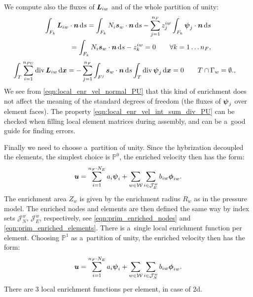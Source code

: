 We compute also the fluxes of $\mathbf{\boldsymbol{L}}_{iw}$ and of the whole partition of unity:
\begin{align}
    \int_{F_k} \mathbf{\boldsymbol{L}}_{iw}\cdot\mathbf{\boldsymbol{n}} \,{\rm d} s = \int_{F_k} N_i \mathbf{\boldsymbol{s}}_w\cdot\mathbf{\boldsymbol{n}} \,{\rm d} s
        - \sum \limits_{j=1}^{n_F} z^{iw}_j \int_{F_k} \mathbf{\boldsymbol{\psi}}_j \cdot \mathbf{\boldsymbol{n}} \,{\rm d} s \nonumber\\
    = \int_{F_k} N_i \mathbf{\boldsymbol{s}}_w\cdot\mathbf{\boldsymbol{n}} \,{\rm d} s - z^{iw}_k = 0 \qquad \forall k=1\ldots n_F
    \label{eqn:local_enr_vel_normal_PU},
\end{align}
\begin{align}
    \int_{T} \sum \limits_{i=1}^{n_{PU}} \div\,\vc L_{iw}\dd\bx =
        - \sum \limits_{j=1}^{n_F} \int_{F^j} \vc s_w\cdot\vc n \dd s
        \int_T \div\,\vc\psi_j \dd \bx %
        = 0 & \qquad T \cap \Gamma_w=\emptyset.
    \label{eqn:local_enr_vel_int_sum_div_PU},
\end{align}
We see from \eqref{eqn:local_enr_vel_normal_PU} that this kind of enrichment does not affect the meaning of the standard
degrees of freedom (the fluxes of $\mathbf{\boldsymbol{\psi}}_j$ over element faces).
The property \eqref{eqn:local_enr_vel_int_sum_div_PU} can be checked when filling local element matrices during assembly,
and can be a~good guide for finding errors.

Finally we need to choose a~partition of unity. Since the hybrization decoupled the elements,
the simplest choice is $\mathbb P^0$, 
the enriched velocity then has the form:
\begin{equation}
    \mathbf{\boldsymbol{u}} = 
    \sum \limits_{i=1}^{n_F\cdot N_E} a_i \mathbf{\boldsymbol{\psi}}_i + 
    \sum \limits_{w\in\mathcal{W}} \sum \limits_{i\in\mathcal{J}^w_E} b_{iw} \mathbf{\boldsymbol{\phi}}_{iw}.
\end{equation}
The enrichment area $Z_w$ is given by the enrichment radius $R_w$ as in the pressure model.
The enriched nodes and elements are then defined the same way by index sets $\mathcal{J}^w_N,\,\mathcal{J}^w_E$, respectively,
see \eqref{eqn:prim_enriched_nodes} and \eqref{eqn:prim_enriched_elements}.
There is a~single local enrichment function per element.
Choosing $\mathbb P^1$ as a~partition of unity,
the enriched velocity then has the form:
\begin{equation}
    \mathbf{\boldsymbol{u}} = 
    \sum \limits_{i=1}^{n_F\cdot N_E} a_i \mathbf{\boldsymbol{\psi}}_i + 
    \sum \limits_{w\in\mathcal{W}} \sum \limits_{i\in\mathcal{J}^w_N} b_{iw} \mathbf{\boldsymbol{\phi}}_{iw}.
\end{equation}
There are 3 local enrichment functions per element, in case of 2d.

